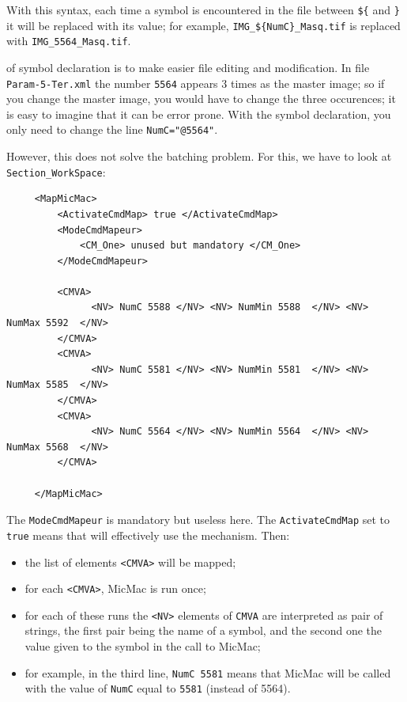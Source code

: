 With this syntax, each time a symbol is encountered in the file between {\tt \$\{} and  {\tt \}}
it  will be replaced with its value; for example, {\tt IMG\_\$\{NumC\}\_Masq.tif} is replaced
with {\tt IMG\_5564\_Masq.tif}.

 of symbol declaration is to make easier file
editing and modification. In file {\tt Param-5-Ter.xml} the number {\tt 5564} appears
$3$ times as the master image; so if you change the master image, you would have to change
the three occurences; it is easy to imagine that it can be error prone. With the symbol
declaration, you only need to change the line {\tt  NumC="@5564"}.

However, this does not solve the batching problem.  
For this, we have to look at {\tt Section\_WorkSpace}:

{\scriptsize
\begin{verbatim}
     <MapMicMac>
         <ActivateCmdMap> true </ActivateCmdMap>
         <ModeCmdMapeur>
             <CM_One> unused but mandatory </CM_One>
         </ModeCmdMapeur>

         <CMVA>
               <NV> NumC 5588 </NV> <NV> NumMin 5588  </NV> <NV> NumMax 5592  </NV>
         </CMVA>
         <CMVA>
               <NV> NumC 5581 </NV> <NV> NumMin 5581  </NV> <NV> NumMax 5585  </NV>
         </CMVA>
         <CMVA>
               <NV> NumC 5564 </NV> <NV> NumMin 5564  </NV> <NV> NumMax 5568  </NV>
         </CMVA>

     </MapMicMac>
\end{verbatim}
}

The {\tt ModeCmdMapeur} is mandatory but useless here. The {\tt ActivateCmdMap} set to {\tt true}
means that will effectively use the mechanism. Then:

\begin{itemize}
    \item the list of elements {\tt <CMVA>} will be mapped;
    \item for each {\tt <CMVA>}, MicMac is run once;
    \item for each of these runs the {\tt <NV>}  elements of  {\tt CMVA} are
          interpreted as pair of strings, the first pair being the name of a symbol, and
          the second one the value given to the symbol in the call to MicMac;
    \item for example, in the third line, {\tt NumC 5581} means that MicMac will
          be called with the value of {\tt NumC} equal to {\tt 5581} (instead of 5564).
\end{itemize}

